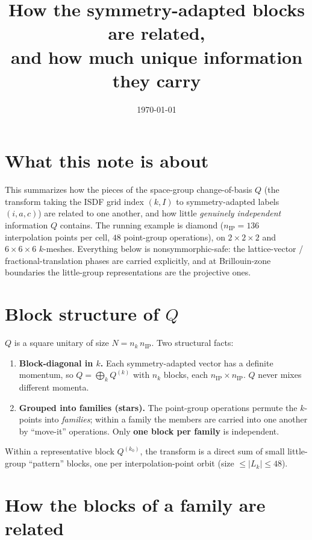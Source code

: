 \documentclass[11pt]{article}
\title{\vspace{-1.2cm}How the symmetry-adapted blocks are related,\\[2pt]
\large and how much unique information they carry}
\author{}
\date{\today}
\begin{document}
\maketitle
\vspace{-0.9cm}

\section*{What this note is about}

This summarizes how the pieces of the space-group change-of-basis $Q$ (the transform taking the
ISDF grid index $(k,I)$ to symmetry-adapted labels $(i,a,c)$) are related to one another, and how
little \emph{genuinely independent} information $Q$ contains. The running example is diamond
($n_{\mathrm{IP}}=136$ interpolation points per cell, $48$ point-group operations), on $2\times2\times2$
and $6\times6\times6$ $k$-meshes. Everything below is nonsymmorphic-safe: the lattice-vector /
fractional-translation phases are carried explicitly, and at Brillouin-zone boundaries the
little-group representations are the projective ones.

\section{Block structure of $Q$}

$Q$ is a square unitary of size $N=n_k\,n_{\mathrm{IP}}$. Two structural facts:

\begin{enumerate}[nosep]
  \item \textbf{Block-diagonal in $k$.} Each symmetry-adapted vector has a definite momentum, so
        $Q=\bigoplus_k Q^{(k)}$ with $n_k$ blocks, each $n_{\mathrm{IP}}\times n_{\mathrm{IP}}$.
        $Q$ never mixes different momenta.
  \item \textbf{Grouped into families (stars).} The point-group operations permute the $k$-points
        into \emph{families}; within a family the members are carried into one another by
        ``move-it'' operations. Only \textbf{one block per family} is independent.
\end{enumerate}

Within a representative block $Q^{(k_0)}$, the transform is a direct sum of small little-group
``pattern'' blocks, one per interpolation-point orbit (size $\le |L_k|\le 48$).

\section{How the blocks of a family are related}
\end{document}

